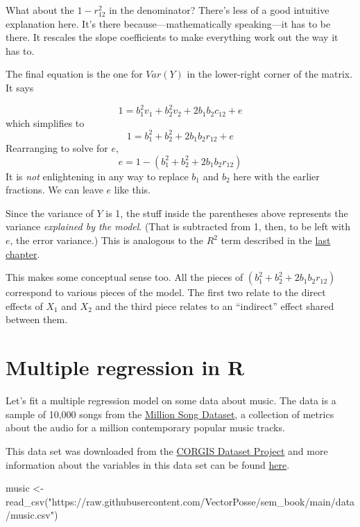 \documentclass[
]{book}
\newenvironment{Shaded}{\begin{snugshade}}{\end{snugshade}}
\newcommand{\FunctionTok}[1]{\textcolor[rgb]{0.00,0.00,0.00}{#1}}
\newcommand{\NormalTok}[1]{#1}
\newcommand{\OtherTok}[1]{\textcolor[rgb]{0.56,0.35,0.01}{#1}}
\newcommand{\StringTok}[1]{\textcolor[rgb]{0.31,0.60,0.02}{#1}}
\begin{document}
What about the \(1 - r_{12}^{2}\) in the denominator? There's less of a good intuitive explanation here. It's there because---mathematically speaking---it has to be there. It rescales the slope coefficients to make everything work out the way it has to.

The final equation is the one for \(Var(Y)\) in the lower-right corner of the matrix. It says

\[
1 = b_{1}^{2} v_{1} + b_{2}^{2} v_{2} + 2b_{1}b_{2} c_{12} + e
\]
which simplifies to
\[
1 = b_{1}^{2} + b_{2}^{2} + 2b_{1}b_{2} r_{12} + e
\]
Rearranging to solve for \(e\),
\[
e = 1 - \left(b_{1}^{2} + b_{2}^{2} + 2b_{1}b_{2} r_{12}\right)
\]
It is \emph{not} enlightening in any way to replace \(b_{1}\) and \(b_{2}\) here with the earlier fractions. We can leave \(e\) like this.

Since the variance of \(Y\) is 1, the stuff inside the parentheses above represents the variance \emph{explained by the model}. (That is subtracted from 1, then, to be left with \(e\), the error variance.) This is analogous to the \(R^{2}\) term described in the \protect\hyperlink{simple-error-correlation}{last chapter}.

This makes some conceptual sense too. All the pieces of \(\left(b_{1}^{2} + b_{2}^{2} + 2b_{1}b_{2} r_{12}\right)\) correspond to various pieces of the model. The first two relate to the direct effects of \(X_{1}\) and \(X_{2}\) and the third piece relates to an ``indirect'' effect shared between them.

\hypertarget{multiple-r}{%
\section{Multiple regression in R}\label{multiple-r}}

Let's fit a multiple regression model on some data about music. The data is a sample of 10,000 songs from the \href{http://millionsongdataset.com/}{Million Song Dataset}, a collection of metrics about the audio for a million contemporary popular music tracks.

This data set was downloaded from the \href{https://corgis-edu.github.io/corgis/csv/}{CORGIS Dataset Project} and more information about the variables in this data set can be found \href{https://corgis-edu.github.io/corgis/csv/music/}{here}.

\begin{Shaded}
\begin{Highlighting}[]
\NormalTok{music }\OtherTok{\textless{}{-}} \FunctionTok{read\_csv}\NormalTok{(}\StringTok{"https://raw.githubusercontent.com/VectorPosse/sem\_book/main/data/music.csv"}\NormalTok{)}
\end{Highlighting}
\end{Shaded}
\end{document}
